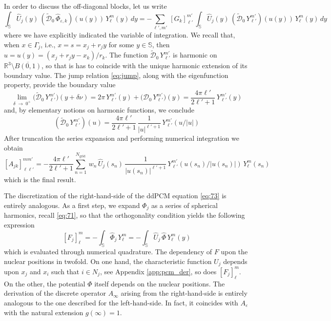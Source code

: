 \documentclass[aip,jcp,a4paper,11pt]{revtex4-1}
\newcommand{\cD}{\mathcal{D}}
\begin{document}
In order to discuss the off-diagonal blocks, let us write
\[
 \int_{\mathbb{S}} \hat{U}_j(y) \, (\tilde{\cD}_0 \, \hat{\Phi}_{\varepsilon,k})(u(y)) \, Y_{\ell}^{m}(y) \, dy = - \sum_{\ell',m'} \, [G_k]_{\ell'}^{m'} \,  \int_{\mathbb{S}} \hat{U}_j(y) \, (\tilde{\cD}_0 \, Y_{\ell'}^{m'})(u(y)) \, Y_{\ell}^{m}(y) \, dy 
\]
where we have explicitly indicated the variable of integration. We recall that, when $x \in \Gamma_j$, i.e., $x = s = x_j + r_j y$ for some $y \in \mathbb{S}$, then $u = u(y) = (x_j + r_j y -x_k)/r_k$. The function $\tilde{\cD}_0 \, Y_{\ell'}^{m'}$ is harmonic on $\mathbb{R}^3 \setminus \overline{B(0,1)}$, so that is has to coincide with the unique harmonic extension of its boundary value. The jump relation \eqref{eq:jump}, along with the eigenfunction property, provide the boundary value
\[
\lim_{\delta \; \to \; 0^+} \big(\tilde{\cD}_0 \, Y_{\ell'}^{m'}\big)(y + \delta \nu) =  2\pi \,Y_{\ell'}^{m'}(y)+ \big( \cD_0 \, Y_{\ell'}^{m'} \big)(y) = \frac{4 \pi \ell'}{2 \ell' + 1} \, Y_{\ell'}^{m'}(y)
\]
and, by elementary notions on harmonic functions, we conclude
\[
(\tilde{\cD}_0 \, Y_{\ell'}^{m'})(u) = \frac{4 \pi \ell'}{2 \ell' + 1} \, \frac{1}{|u|^{\ell' + 1}} \,  Y_{\ell'}^{m'}(u/|u|)
\]
After truncation the series expansion and performing numerical integration we obtain
\begin{equation}\label{eq:ajk}
[A_{jk}]_{\ell \ell'}^{m m'} =-  \frac{4 \pi \ell'}{2 \ell' + 1}  \sum_{n=1}^{N_\text{grid}} \, w_n  \,  \hat{U}_j(s_n) \, \frac{1}{|u(s_n)|^{\ell' + 1}} \, Y_{\ell'}^{m'}(u(s_n) / |u(s_n)|) \, Y_{\ell}^{m}(s_n)
\end{equation}
which is the final result.


The discretization of the right-hand-side of the ddPCM equation \eqref{eq:73} is entirely analogous. As a first step, we expand $\Phi_j$ as a series of spherical harmonics, recall \eqref{eq:71}, so that the orthogonality condition yields the following expression
\[
[F_j]_\ell^m = - \int_{\mathbb{S}} \hat{\Phi}_j \, Y_\ell^m= - \int_{\mathbb{S}} \hat{U}_j \, \hat{\Phi} \, Y_\ell^m(y)
\]
which is evaluated through numerical quadrature. The dependency of $F$ upon the nuclear positions in twofold. On one hand, the characteristic function $U_j$ depends upon $x_j$ and $x_i$ such that $i \in N_j$, see Appendix \ref{app:pcm_der}, so does $[F_j]_\ell^m$. On the other, the potential $\Phi$ itself depends on the nuclear positions. The derivation of the discrete operator $A_\infty$ arising from the right-hand-side is entirely analogous to the one described for the left-hand-side. In fact, it coincides with $A_\varepsilon$ with the natural extension $g(\infty) = 1$.
\end{document}
